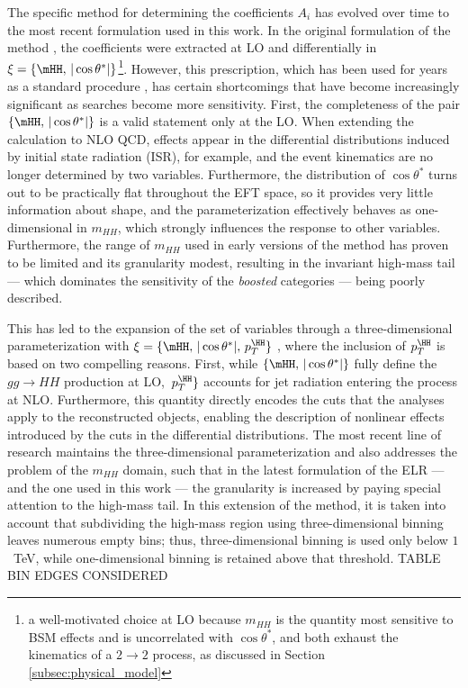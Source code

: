 The specific method for determining the coefficients $A_i$ has evolved over time to the most recent formulation used in this work. In the original formulation of the method \cite{Carvalho:2017vnu}, the coefficients were extracted at LO and differentially in $\xi=\{\mHH,\, |\cos\theta^*|\}$\footnote{a well-motivated choice at LO because $m_{HH}$ is the quantity most sensitive to BSM effects and is uncorrelated with $\cos\theta^*$, and both exhaust the kinematics of a $2\to2$ process, as discussed in Section \ref{subsec:physical_model}}. However, this prescription, which has been used for years as a standard procedure \cite{CMS_combination}, has certain shortcomings that have become increasingly significant as searches become more sensitivity. First, the completeness of the pair $\{\mHH,\,|\cos\theta^*|\}$ is a valid statement only at the LO. When extending the calculation to NLO QCD, effects appear in the differential distributions induced by initial state radiation (ISR), for example, and the event kinematics are no longer determined by two variables. Furthermore, the distribution of $\cos\theta^*$ turns out to be practically flat throughout the EFT space, so it provides very little information about shape, and the parameterization effectively behaves as one-dimensional in $m_{HH}$, which strongly influences the response to other variables. Furthermore, the range of $m_{HH}$ used in early versions of the method has proven to be limited and its granularity modest, resulting in the invariant high-mass tail — which dominates the sensitivity of the \textit{boosted} categories — being poorly described.

This has led to the expansion of the set of variables through a three-dimensional parameterization with $\xi=\{\mHH,\,|\cos\theta^*|,\,p_T^{\HH}\}$ \cite{Cadamuro:2025car}, where the inclusion of $p_T^{\HH}$ is based on two compelling reasons. First, while $\{\mHH,\,|\cos\theta^*|\}$ fully define the $gg\to HH$ production at LO, $\,p_T^{\HH}\}$ accounts for jet radiation entering the process at NLO. Furthermore, this quantity directly encodes the cuts that the analyses apply to the reconstructed objects, enabling the description of nonlinear effects introduced by the cuts in the differential distributions. The most recent line of research \cite{HHReweighting} maintains the three-dimensional parameterization and also addresses the problem of the $m_{HH}$ domain, such that in the latest formulation of the ELR — and the one used in this work — the granularity is increased by paying special attention to the high-mass tail. In this extension of the method, it is taken into account that subdividing the high-mass region using three-dimensional binning leaves numerous empty bins; thus, three-dimensional binning is used only below $1$~TeV, while one-dimensional binning is retained above that threshold. TABLE BIN EDGES CONSIDERED

